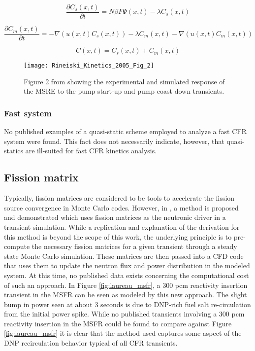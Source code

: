 \documentclass[review]{elsarticle}
\begin{document}
\begin{equation}
    \label{eq:spk_static}
    \frac{\partial C_{s}(x,t)}{\partial t} = N \beta F \Psi(x,t) -
        \lambda C_{s}(x,t)
\end{equation}
 
\begin{equation}
    \label{eq:spk_move}
    \frac{\partial C_{m}(x,t)}{\partial t} = - \nabla (u(x,t) C_{s}(x,t)) -
        \lambda C_{m}(x,t) - \nabla(u(x,t) C_{m}(x,t))
\end{equation}

\begin{equation}
    \label{eq:spk_uni}
    C(x,t) = C_{s}(x,t) + C_{m}(x,t)
\end{equation}

\begin{figure}[H]
   \centering
   \texttt{[image: Rineiski\_Kinetics\_2005\_Fig\_2]}
   \caption{Figure 2 from \cite{rineiski_kinetics_2005} showing the experimental and simulated
   response of the MSRE to the pump start-up and pump coast down transients.} 
   \label{fig:rineiski_msre_ps}
\end{figure}

\subsubsection{Fast system} \label{sssec:qs_fast}
No published examples of a quasi-static scheme employed to analyze a fast
CFR system were found. This fact  does not necessarily indicate, however, that
quasi-statics are ill-suited for fast CFR kinetics analysis.

\subsection{Fission matrix}
Typically, fission matrices are considered to be tools to accelerate the fission
source convergence in Monte Carlo codes. However, in 
\cite{laureau_coupled_2015}, a method is proposed and demonstrated which uses
fission matrices as the neutronic driver in a transient simulation. While a
replication and explanation of the derivation for this method is beyond the
scope of this work, the underlying principle is to pre-compute the necessary
fission matrices for a given transient through a steady state Monte Carlo
simulation. These matrices are then passed into a CFD code that uses them
to update the neutron flux and power distribution in the modeled system. At
this time, no published data exists concerning the computational cost
of such an approach. In Figure \ref{fig:laureau_msfr}, a 300 pcm reactivity
insertion transient in the MSFR can be seen as modeled by this new approach. The
slight bump in power seen at about 3 seconds is due to DNP-rich fuel salt
re-circulation from the initial power spike. While no published transients
involving a 300 pcm reactivity insertion in the MSFR could be found to compare
against Figure \ref{fig:laureau_msfr} it is clear that the method used
captures some aspect of the DNP recirculation behavior typical of all CFR
transients.
\end{document}
